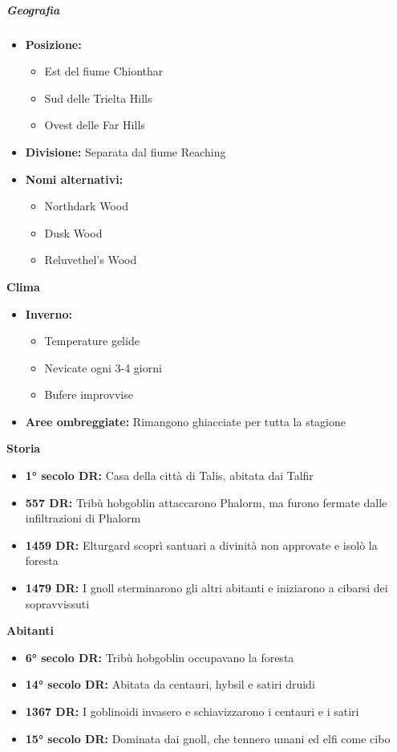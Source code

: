 \documentclass{article}
\begin{document}
\subparagraph{Geografia}
\begin{itemize}
    \item \textbf{Posizione:} 
    \begin{itemize}
        \item Est del fiume Chionthar
        \item Sud delle Trielta Hills
        \item Ovest delle Far Hills
    \end{itemize}
    \item \textbf{Divisione:} Separata dal fiume Reaching
    \item \textbf{Nomi alternativi:} 
    \begin{itemize}
        \item Northdark Wood
        \item Dusk Wood
        \item Reluvethel's Wood
    \end{itemize}
\end{itemize}
\textbf{Clima}
\begin{itemize}
    \item \textbf{Inverno:} 
    \begin{itemize}
        \item Temperature gelide
        \item Nevicate ogni 3-4 giorni
        \item Bufere improvvise
    \end{itemize}
    \item \textbf{Aree ombreggiate:} Rimangono ghiacciate per tutta la stagione
\end{itemize}
\textbf{Storia}
\begin{itemize}
    \item \textbf{1° secolo DR:} Casa della città di Talis, abitata dai Talfir
    \item \textbf{557 DR:} Tribù hobgoblin attaccarono Phalorm, ma furono fermate dalle infiltrazioni di Phalorm
    \item \textbf{1459 DR:} Elturgard scoprì santuari a divinità non approvate e isolò la foresta
    \item \textbf{1479 DR:} I gnoll sterminarono gli altri abitanti e iniziarono a cibarsi dei sopravvissuti
\end{itemize}
\textbf{Abitanti}
\begin{itemize}
    \item \textbf{6° secolo DR:} Tribù hobgoblin occupavano la foresta
    \item \textbf{14° secolo DR:} Abitata da centauri, hybsil e satiri druidi
    \item \textbf{1367 DR:} I goblinoidi invasero e schiavizzarono i centauri e i satiri
    \item \textbf{15° secolo DR:} Dominata dai gnoll, che tennero umani ed elfi come cibo
\end{itemize}
\end{document}
